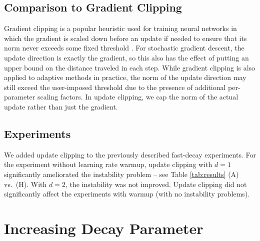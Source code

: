 \documentclass{article}
\begin{document}
\subsection{Comparison to Gradient Clipping}
Gradient clipping is a popular heuristic used for training neural networks in which the gradient is scaled down before an update if needed to ensure that its norm never exceeds some fixed threshold \cite{Pascanu13Difficulty}. For stochastic gradient descent, the update direction is exactly the gradient, so this also has the effect of putting an upper bound on the distance traveled in each step.  While gradient clipping is also applied to adaptive methods in practice, the norm of the update direction may still exceed the user-imposed threshold due to the presence of additional per-parameter scaling factors.  In update clipping, we cap the norm of the actual update rather than just the gradient.

\subsection{Experiments}
We added update clipping to the previously described fast-decay experiments.  For the experiment without learning rate warmup, update clipping with $d=1$ significantly ameliorated the instability problem -- see Table \ref{tab:results} (A) vs.\ (H).  With $d=2$, the instability was not improved.  Update clipping did not significantly affect the experiments with warmup (with no instability problems).







\section{Increasing Decay Parameter}
\end{document}
